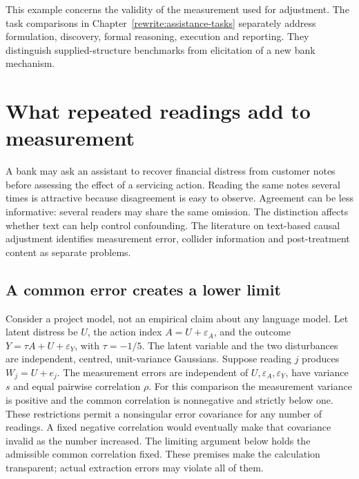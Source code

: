 This example concerns the validity of the measurement used for adjustment.
The task comparisons in Chapter~\ref{rewrite:assistance-tasks} separately
address formulation, discovery, formal reasoning, execution and reporting.
They distinguish supplied-structure benchmarks from elicitation of a new
bank mechanism. \citep{v12_la_2312_04350,v12_la_2606_23608}


\section{What repeated readings add to measurement}
\label{gap29:measurement}

A bank may ask an assistant to recover financial distress from customer
notes before assessing the effect of a servicing action. Reading the same
notes several times is attractive because disagreement is easy to observe.
Agreement can be less informative: several readers may share the same
omission. The distinction affects whether text can help control confounding.
The literature on text-based causal adjustment identifies measurement error,
collider information and post-treatment content as separate problems.
\citep{exec13_census_text_review_arxiv}

\subsection{A common error creates a lower limit}
Consider a project model, not an empirical claim about any language model.
Let latent distress be $U$, the action index $A=U+\varepsilon_A$, and
the outcome $Y=\tau A+U+\varepsilon_Y$, with $\tau=-1/5$. The latent
variable and the two disturbances are independent, centred, unit-variance
Gaussians. Suppose reading $j$ produces $W_j=U+e_j$. The measurement errors
are independent of $U,\varepsilon_A,\varepsilon_Y$, have variance $s$ and
equal pairwise correlation $\rho$. For this comparison the measurement
variance is positive and the common correlation is nonnegative and strictly
below one. These restrictions permit a nonsingular error covariance for any
number of readings. A fixed negative correlation would eventually make that
covariance invalid as the number increased. The limiting argument below
holds the admissible common correlation fixed. These premises make the
calculation transparent; actual extraction errors may violate all of them.

